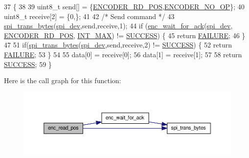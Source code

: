 \begin{DoxyCode}
37                                                       \{
38 
39     uint8\_t send[] = \{\hyperlink{encoder__functions_8h_a24e6c0e05e904b10f56ae184da9e2aca}{ENCODER\_RD\_POS},\hyperlink{encoder__functions_8h_ac10b0f18ed2164776ad6843aa7908592}{ENCODER\_NO\_OP}\};
40     uint8\_t receive[2] = \{0,\};
41     
42     \textcolor{comment}{/* Send command */}
43     \hyperlink{communication_2spi__functions_8c_a3ae450d2b3ece27bb6036f811a7625a9}{spi\_trans\_bytes}(\hyperlink{CommunicationV0_2communication_8c_a4788f0a5355494bc6c13690e28f43783}{spi\_dev},send,receive,1);
44     \textcolor{keywordflow}{if} (\hyperlink{group__enc_gad82fb44f2e735628ec95e003e4a1f93c}{enc\_wait\_for\_ack}(\hyperlink{CommunicationV0_2communication_8c_a4788f0a5355494bc6c13690e28f43783}{spi\_dev}, \hyperlink{encoder__functions_8h_a24e6c0e05e904b10f56ae184da9e2aca}{ENCODER\_RD\_POS}, 
      \hyperlink{encoder__functions_8h_a9ec306f36d50c7375e74f0d1c55a3a67}{INT\_MAX}) != \hyperlink{calibration_2calibration_8h_aa90cac659d18e8ef6294c7ae337f6b58}{SUCCESS}) \{ 
45         \textcolor{keywordflow}{return} \hyperlink{calibration_2calibration_8h_a6d58f9ac447476b4e084d7ca383f5183}{FAILURE}; 
46     \}
47 
51     \textcolor{keywordflow}{if}(\hyperlink{communication_2spi__functions_8c_a3ae450d2b3ece27bb6036f811a7625a9}{spi\_trans\_bytes}(\hyperlink{CommunicationV0_2communication_8c_a4788f0a5355494bc6c13690e28f43783}{spi\_dev},send,receive,2) != \hyperlink{calibration_2calibration_8h_aa90cac659d18e8ef6294c7ae337f6b58}{SUCCESS}) \{ 
52         \textcolor{keywordflow}{return} \hyperlink{calibration_2calibration_8h_a6d58f9ac447476b4e084d7ca383f5183}{FAILURE}; 
53     \}
54 
55    data[0] = receive[0];
56    data[1] = receive[1];
57 
58    \textcolor{keywordflow}{return} \hyperlink{calibration_2calibration_8h_aa90cac659d18e8ef6294c7ae337f6b58}{SUCCESS};
59 \}
\end{DoxyCode}


Here is the call graph for this function\-:\nopagebreak
\begin{figure}[H]
\begin{center}
\leavevmode
\includegraphics[width=350pt]{group__enc_ga813c09cc4d9af8b357fe440a9438e685_cgraph}
\end{center}
\end{figure}




